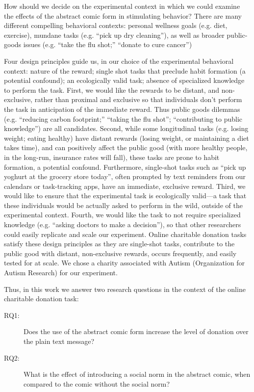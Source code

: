 How should we decide on the experimental context in which we could examine the effects of the abstract comic form in stimulating behavior? There are many different compelling behavioral contexts: personal wellness goals (e.g. diet, exercise), mundane tasks (e.g. ``pick up dry cleaning''), as well as broader public-goods issues (e.g. ``take the flu shot;'' ``donate to cure cancer'')

Four design principles guide us, in our choice of the experimental behavioral context: nature of the reward; single shot tasks that preclude habit formation (a potential confound); an ecologically valid task; absence of specialized knowledge to perform the task. First, we would like the rewards to be distant, and non-exclusive, rather than proximal and exclusive so that individuals don't perform the task in anticipation of the immediate reward. Thus public goods dilemmas (e.g. ``reducing carbon footprint;'' ``taking the flu shot''; ``contributing to public knowledge'') are all candidates. Second, while some longitudinal tasks (e.g. losing weight; eating healthy) have distant rewards (losing weight, or maintaining a diet takes time), and can positively affect the public good (with more healthy people, in the long-run, insurance rates will fall), these tasks are prone to habit formation, a potential confound. Furthermore, single-shot tasks such as ``pick up yoghurt at the grocery store today'', often prompted by text reminders from our calendars or task-tracking apps, have an immediate, exclusive reward. Third, we would like to ensure that the experimental task is ecologically valid---a task that these individuals would be actually asked to perform in the wild, outside of the experimental context. Fourth, we would like the task to not require specialized knowledge (e.g. ``asking doctors to make a decision''), so that other researchers could easily replicate and scale our experiment. Online charitable donation tasks satisfy these design principles as they are single-shot tasks, contribute to the public good with distant, non-exclusive rewards, occurs frequently, and easily tested for at scale. We chose a charity associated with Autism (Organization for Autism Research) for our experiment.

Thus, in this work we answer two research questions in the context of the online charitable donation task:
\begin{description}
    \item[RQ1:] Does the use of the abstract comic form increase the level of donation over the plain text message?
    \item[RQ2:] What is the effect of introducing a social norm in the abstract comic, when compared to the comic without the social norm?
\end{description}

